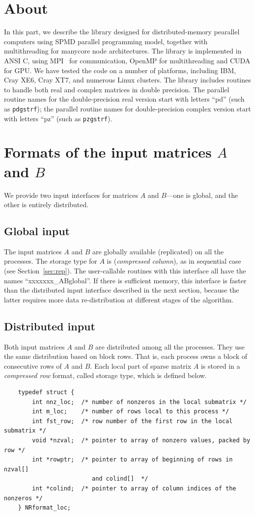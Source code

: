 \section{About {\superlud}}
In this part, we describe the {\superlud} library designed for
distributed-memory pearallel computers using SPMD parallel programming model,
together with multithreading for manycore node architectures.
The library is implemented in ANSI C, using MPI~\cite{mpi-forum}
for communication, OpenMP for multithreading and CUDA for GPU.
 We have tested the code on a number of platforms, including IBM, 
Cray XE6, Cray XT7, and numerous Linux clusters.
The library includes routines to handle both real and complex matrices
in double precision.
The parallel routine names for the double-precision real version start
with letters ``pd'' (such as {\tt pdgstrf}); the parallel routine
names for double-precision complex version start with letters ``pz''
(such as {\tt pzgstrf}).

\section{Formats of the input matrices $A$ and $B$}
\label{sec:InputFormat}
We provide two input interfaces for matrices $A$ and $B$---one
is global, and the other is entirely distributed.

\subsection{Global input}\label{sec:GlobalInput}
The input matrices $A$ and $B$ are globally
available (replicated) on all the processes. The storage type for $A$
is {\NC} ({\em compressed column}), as in sequential case
(see Section~\ref{sec:rep}). The user-callable routines with this interface
all have the names ``xxxxxxx\_ABglobal''.
If there is sufficient memory, this interface is faster than
the distributed input interface described in the next section,
because the latter requires more data re-distribution at
different stages of the algorithm.

\subsection{Distributed input}\label{sec:DistInput}
Both input matrices $A$ and $B$ are distributed among all the processes.
They use the same distribution based on block rows.
That is, each process owns a block of consecutive rows of $A$ and $B$.
Each local part of sparse matrix $A$ is stored in a {\em compressed row}
format, called {\NRloc} storage type, which is defined below.
\begin{verbatim}
    typedef struct {
        int nnz_loc;  /* number of nonzeros in the local submatrix */
        int m_loc;    /* number of rows local to this process */
        int fst_row;  /* row number of the first row in the local submatrix */
        void *nzval;  /* pointer to array of nonzero values, packed by row */
        int *rowptr;  /* pointer to array of beginning of rows in nzval[] 
                         and colind[]  */
        int *colind;  /* pointer to array of column indices of the nonzeros */
    } NRformat_loc;
\end{verbatim}

